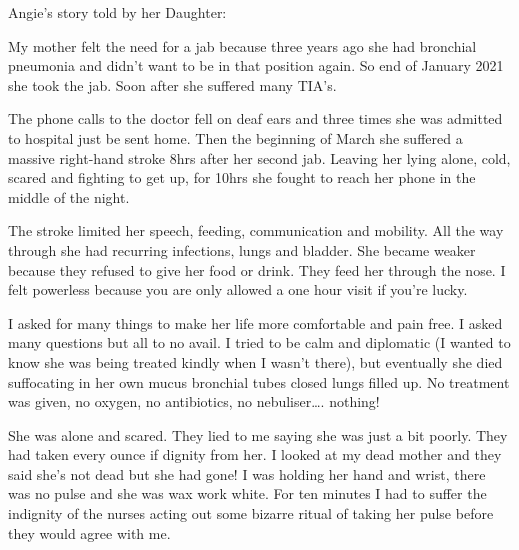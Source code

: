 Angie’s story told by her Daughter:

My mother felt the need for a jab because three years ago she had bronchial
pneumonia and didn’t want to be in that position again. So end of January 2021
she took the jab. Soon after she suffered many TIA’s.

The phone calls to the doctor fell on deaf ears and three times she was admitted
to hospital just be sent home. Then the beginning of March she suffered a
massive right-hand stroke 8hrs after her second jab. Leaving her lying alone,
cold, scared and fighting to get up, for 10hrs she fought to reach her phone in
the middle of the night.

The stroke limited her speech, feeding, communication and mobility. All the way
through she had recurring infections, lungs and bladder. She became weaker
because they refused to give her food or drink. They feed her through the
nose. I felt powerless because you are only allowed a one hour visit if you’re
lucky.

I asked for many things to make her life more comfortable and pain free. I asked
many questions but all to no avail. I tried to be calm and diplomatic (I wanted
to know she was being treated kindly when I wasn’t there), but eventually she
died suffocating in her own mucus bronchial tubes closed lungs filled up. No
treatment was given, no oxygen, no antibiotics, no nebuliser…. nothing!

She was alone and scared. They lied to me saying she was just a bit poorly. They
had taken every ounce if dignity from her. I looked at my dead mother and they
said she’s not dead but she had gone! I was holding her hand and wrist, there
was no pulse and she was wax work white. For ten minutes I had to suffer the
indignity of the nurses acting out some bizarre ritual of taking her pulse
before they would agree with me.

